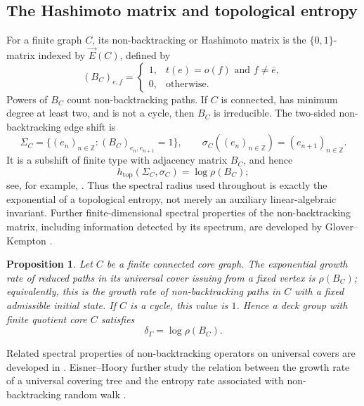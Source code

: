 \documentclass[11pt]{amsart}
\theoremstyle{plain}
\newtheorem{proposition}[theorem]{Proposition}
\theoremstyle{definition}
\theoremstyle{remark}
\newcommand{\ZZ}{\mathbb Z}
\begin{document}
\subsection{The Hashimoto matrix and topological entropy}

For a finite graph \(C\), its non-backtracking or Hashimoto matrix is the
\(\{0,1\}\)-matrix indexed by \(\vec E(C)\), defined by
\begin{equation}\label{eq:hashimoto}
  (B_C)_{e,f}
  =\begin{cases}
      1,&t(e)=o(f)\text{ and }f\neq\bar e,\\
      0,&\text{otherwise}.
    \end{cases}
\end{equation}
Powers of \(B_C\) count non-backtracking paths.  If \(C\) is connected, has
minimum degree at least two, and is not a cycle, then \(B_C\) is irreducible.
The two-sided non-backtracking edge shift is
\[
  \Sigma_C=\{(e_n)_{n\in\ZZ}: (B_C)_{e_n,e_{n+1}}=1\},
  \qquad \sigma_C((e_n)_{n\in\ZZ})=(e_{n+1})_{n\in\ZZ}.
\]
It is a subshift of finite type with adjacency matrix \(B_C\), and hence
\begin{equation}\label{eq:hashimoto-topological-entropy}
  h_{\mathrm{top}}(\Sigma_C,\sigma_C)=\log\rho(B_C);
\end{equation}
see, for example, \cite{Lind1984}.  Thus the spectral radius used throughout
is exactly the exponential of a topological entropy, not merely an auxiliary
linear-algebraic invariant.
Further finite-dimensional spectral properties of the non-backtracking
matrix, including information detected by its spectrum, are developed by
Glover--Kempton \cite{GloverKempton2021}.

\begin{proposition}\label{prop:finite-core-growth}
Let \(C\) be a finite connected core graph.  The exponential growth rate of
reduced paths in its universal cover issuing from a fixed vertex is
\(\rho(B_C)\); equivalently, this is the growth rate of non-backtracking paths
in \(C\) with a fixed admissible initial state.  If \(C\) is a cycle, this
value is \(1\).  Hence a deck group with finite quotient core \(C\) satisfies
\begin{equation}\label{eq:delta-rhoB}
  \delta_\Gamma=\log\rho(B_C).
\end{equation}
\end{proposition}

Related spectral properties of non-backtracking operators on universal
covers are developed in \cite{AngelFriedmanHoory2015}.
Eisner--Hoory further study the relation between the growth rate of a
universal covering tree and the entropy rate associated with non-backtracking
random walk \cite{EisnerHoory2026}.
\end{document}

